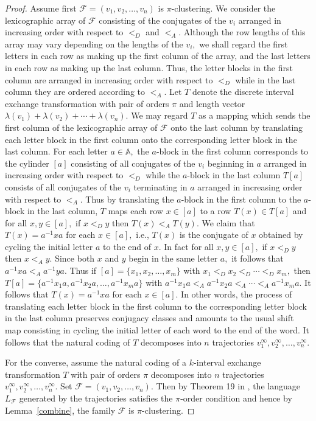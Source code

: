 \documentclass[12pt,a4paper]{amsart}
\newcommand{\A}{{\mathbb A}}
\begin{document}
\begin{proof}  Assume first $\mathcal F=(v_1,v_2,\ldots ,v_n)$ is $\pi$-clustering. We consider the lexicographic array of $\mathcal F$ consisting of the conjugates of the $v_i$ arranged in increasing order with respect to $<_D$ and $<_A.$    Although the row lengths of this  array may vary depending on the lengths of the $v_i,$  we shall regard the first letters in each row as making up the first column of the array, and the last letters in each row as making up the last column.  
Thus, the letter blocks in the first column are arranged in increasing order with respect to $<_D$ while in the last column they are ordered according to $<_A.$  Let $T$ denote the discrete interval exchange transformation with pair of orders $\pi$ and length vector $\lambda (v_1)+\lambda (v_2)+\cdots +\lambda (v_n).$ We may regard $T$ as  a mapping  which sends the first column of the lexicographic array of $\mathcal F$ onto the last column by translating each letter block in the first column onto the corresponding letter block in the last column. For each letter $a\in \A,$ the $a$-block in the first column corresponds to the cylinder $[a]$ consisting of all conjugates of  the $v_i$ beginning in $a$ arranged in increasing order with respect to   $<_D$ while the $a$-block in the last column $T[a]$ consists of all conjugates of the $v_i$ terminating in $a$ arranged in increasing order with respect to  $<_A.$ 
Thus by translating the $a$-block in the first column to the $a$-block in the last column, $T$ maps each row $x\in [a]$  to a row $T(x)\in T[a]$ and for all $x,y \in [a],$ if $x<_Dy$ then $T(x)<_A T(y).$
We claim that $T(x)=a^{-1}xa$ for  each $x\in [a],$ i.e., $T(x)$ is the conjugate of $x$ obtained by cycling the initial letter $a$ to the end of $x.$  In fact for all $x,y \in [a],$ if $x<_Dy$ then $x<_A y.$ Since both $x$ and $y$ begin in the same letter $a,$ it follows that $a^{-1}xa<_A a^{-1}ya.$ Thus if $[a]=\{x_1, x_2, \ldots ,x_m\}$ with $x_1<_D x_2<_D \cdots <_D x_m,$ then $T[a]=\{a^{-1}x_1a, a^{-1}x_2a,  \ldots , a^{-1}x_ma\}$ with $a^{-1}x_1a<_Aa^{-1}x_2a<_A \cdots <_A a^{-1}x_ma.$  It follows that  $T(x)=a^{-1}xa$ for each $x\in [a].$ In other words, the process of translating each letter block in the first column to the corresponding letter block in the last column preserves conjugacy classes and amounts to the usual shift map consisting in  cycling the initial letter of each word to the end of the word. It follows that the natural coding of $T$ decomposes into $n$ trajectories $v_1^{ \infty}, v_2^{ \infty} , \ldots , v_n^{ \infty}.$

For the converse,   assume the natural coding of a $k$-interval exchange transformation $T$ with pair of orders $\pi$ decomposes into $n$ trajectories  $v_1^\infty, v_2^\infty,\ldots ,v_n^\infty.$  Set $\mathcal F=(v_1,v_2,\ldots ,v_n).$ Then by Theorem 19 in \cite{fhuz}, the language $L_{\mathcal F}$ generated by the trajectories satisfies the $\pi$-order condition and hence by Lemma~\ref{combine}, the family $\mathcal F$ is $\pi$-clustering.   \end{proof} 
\end{document}
